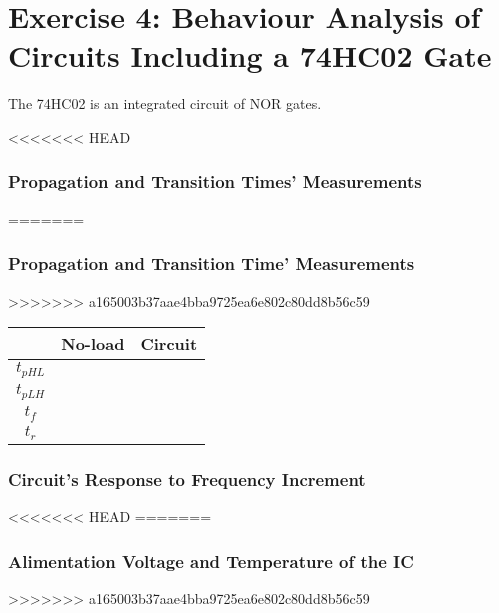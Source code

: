 \documentclass[a4paper,11pt]{report}
\begin{document}
\section{\color{olive}Exercise 4: Behaviour Analysis of Circuits Including a 74HC02 Gate}

The 74HC02 is an integrated circuit of NOR gates.

<<<<<<< HEAD
\subsubsection{\color{red}Propagation and Transition Times' Measurements}
=======
\subsubsection{\color{red}Propagation and Transition Time' Measurements}
>>>>>>> a165003b37aae4bba9725ea6e802c80dd8b56c59

\begin{tabular}{|c|c|c|}
\hline
 &No-load & Circuit \\ %
\hline
\hline
$t_{pHL}$ & &  \\
\hline
$t_{pLH}$ &  & \\
\hline
$t_{f}$ &  & \\
\hline
$t_{r}$ & & \\
\hline
\end{tabular}


\subsubsection{\color{red}Circuit's Response to Frequency Increment}


<<<<<<< HEAD
=======
\subsubsection{\color{red}Alimentation Voltage and Temperature of the IC}


>>>>>>> a165003b37aae4bba9725ea6e802c80dd8b56c59
\end{document}
